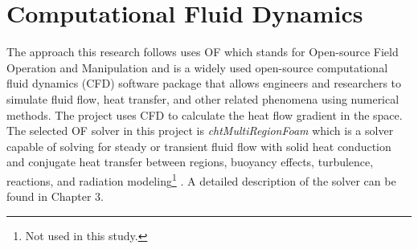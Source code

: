 \section{Computational Fluid Dynamics}
The approach this research follows uses \gls{OF} which stands for Open-source Field Operation and Manipulation and is a widely used open-source computational fluid dynamics  (CFD) software package that allows engineers and researchers to simulate fluid flow, heat transfer, and other related phenomena using numerical methods. The project uses CFD to calculate the heat flow gradient in the space. The selected \gls{OF} solver in this project is \textit{chtMultiRegionFoam} which is a solver capable of solving for steady or transient fluid flow with solid heat conduction and conjugate heat transfer between regions, buoyancy effects, turbulence, reactions, and radiation modeling\footnote{Not used in this study.} \cite{cht}. A detailed description of the solver can be found in Chapter 3.


